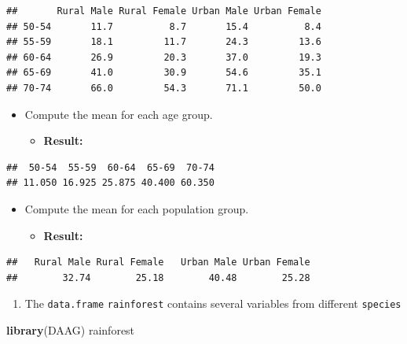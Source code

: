 \documentclass[]{article}
\def\tightlist{}
\newenvironment{Shaded}{\begin{snugshade}}{\end{snugshade}}
\newcommand{\KeywordTok}[1]{\textcolor[rgb]{0.13,0.29,0.53}{\textbf{{#1}}}}
\newcommand{\NormalTok}[1]{{#1}}
\numberwithin{equation}{section}
\begin{document}
\begin{verbatim}
##       Rural Male Rural Female Urban Male Urban Female
## 50-54       11.7          8.7       15.4          8.4
## 55-59       18.1         11.7       24.3         13.6
## 60-64       26.9         20.3       37.0         19.3
## 65-69       41.0         30.9       54.6         35.1
## 70-74       66.0         54.3       71.1         50.0
\end{verbatim}

\begin{itemize}
\item
  Compute the mean for each age group.

  \begin{itemize}
  \tightlist
  \item
    \textbf{Result:}
  \end{itemize}
\end{itemize}

\begin{verbatim}
##  50-54  55-59  60-64  65-69  70-74 
## 11.050 16.925 25.875 40.400 60.350
\end{verbatim}

\begin{itemize}
\item
  Compute the mean for each population group.

  \begin{itemize}
  \tightlist
  \item
    \textbf{Result:}
  \end{itemize}
\end{itemize}

\begin{verbatim}
##   Rural Male Rural Female   Urban Male Urban Female 
##        32.74        25.18        40.48        25.28
\end{verbatim}

\begin{enumerate}
\def\labelenumi{\arabic{enumi}.}
\setcounter{enumi}{1}
\tightlist
\item
  The \texttt{data.frame} \texttt{rainforest} contains several variables
  from different \texttt{species}
\end{enumerate}

\begin{Shaded}
\begin{Highlighting}[]
\KeywordTok{library}\NormalTok{(DAAG)}
\NormalTok{rainforest}
\end{Highlighting}
\end{Shaded}
\end{document}
